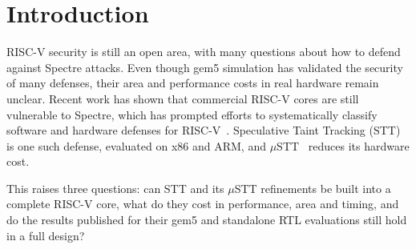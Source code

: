 \section{Introduction}
\label{sec:introduction}

 RISC-V security is still an open area, with many questions about how to defend against 
 Spectre attacks. Even though gem5 simulation has validated the security of many defenses, 
 their area and performance costs in real hardware remain unclear.
 Recent work has shown that commercial RISC-V cores are still vulnerable to Spectre, 
 which has prompted efforts to systematically classify software and hardware defenses for 
 RISC-V~\cite{Gerlach:SpectreClass:2026}. Speculative Taint Tracking
 (STT)~\cite{Yu:STT:2019} is one such defense, evaluated on x86 and ARM, and
 $\mu$STT~\cite{Chen:uSTT:2025} reduces its hardware cost.

 This raises three questions: can STT and its $\mu$STT refinements be built into 
 a complete RISC-V core, what do they cost in performance, area and timing, and 
 do the results published for their gem5 and standalone RTL evaluations still 
 hold in a full design?
